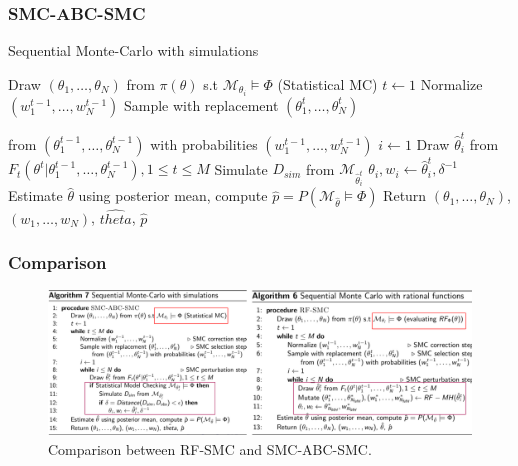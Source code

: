 \documentclass{beamer}
\makeatletter
\def\NoNumber#1{{\def\alglinenumber##1{}\State #1}\addtocounter{ALG@line}{-1}}
\makeatother
\begin{document}
\begin{frame}
    \frametitle{SMC-ABC-SMC}
    \footnotesize{
        \begin{algorithm}[H]
            \caption{Sequential Monte-Carlo with simulations}
            \label{alg:smc-abc-smc}
            \begin{algorithmic}[1]
                \State Draw $(\theta_1,\ldots,\theta_N)$ from $\pi(\theta)$ s.t $\mathcal{M}_{\theta_i}\models\Phi$ (Statistical MC)
                \State $t \leftarrow 1$
                \State Normalize $(w^{t-1}_1,\ldots,w^{t-1}_N)$  
                \State Sample with replacement $(\theta^t_1,\ldots,\theta^t_N)$ 
                \NoNumber{\hspace{.5cm}} from $(\theta^{t-1}_1,\ldots,\theta^{t-1}_N)$ with probabilities $(w^{t-1}_1,\ldots,w^{t-1}_N)$
                \State $i \leftarrow 1$
                 
                \State Draw $\hat{\theta}^t_i$ from $F_t(\theta^t | \theta^{t-1}_1,\ldots,\theta^{t-1}_N), 1\leq t \leq M$
                \State Simulate $D_{sim}$ from $\mathcal{M}_{\hat{\theta}^t_i}$
                \State $\theta_i, w_i \leftarrow \hat{\theta}^t_i, \delta^{-1}$
                \EndIf
                \EndIf
                \EndWhile
                \EndWhile
                \State Estimate $\hat{\theta}$ using posterior mean, compute $\hat{p}=P(\mathcal{M}_{\hat{\theta}}\models\Phi)$
                \State Return $(\theta_1,\ldots,\theta_{N})$, $(w_1,\ldots,w_{N})$, $\hat{theta}$, $\hat{p}$
                \EndProcedure
            \end{algorithmic}
        \end{algorithm}
    }
\end{frame}

\begin{frame}
    \frametitle{Comparison}
    \begin{figure}[H]
        \centering
        \includegraphics[width=\textwidth]{figures/smc-compare.png}
        \caption{Comparison between RF-SMC and SMC-ABC-SMC.}
        \label{fig:comparison}
    \end{figure}
\end{frame}
\end{document}
